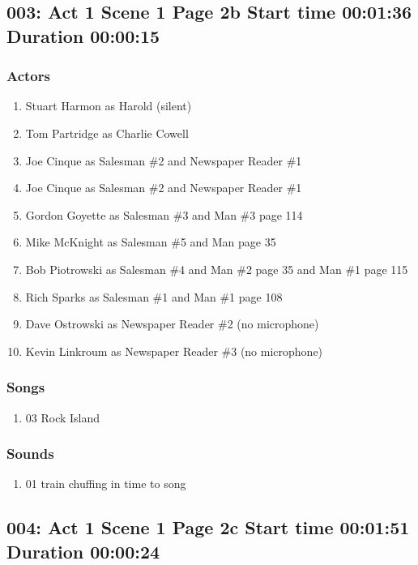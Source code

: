 \subsection{003: Act 1 Scene 1 Page 2b Start time 00:01:36 Duration 00:00:15}

\subsubsection{Actors}
\begin{enumerate}
\item Stuart Harmon as Harold (silent)
\item Tom Partridge as Charlie Cowell
\item Joe Cinque as Salesman \#2 and Newspaper Reader \#1
\item Joe Cinque as Salesman \#2 and Newspaper Reader \#1
\item Gordon Goyette as Salesman \#3 and Man \#3 page 114
\item Mike McKnight as Salesman \#5 and Man page 35
\item Bob Piotrowski as Salesman \#4 and Man \#2 page 35 and Man \#1 page 115
\item Rich Sparks as Salesman \#1 and Man \#1 page 108
\item Dave Ostrowski as Newspaper Reader \#2 (no microphone)
\item Kevin Linkroum as Newspaper Reader \#3 (no microphone)
\end{enumerate}

\subsubsection{Songs}
\begin{enumerate}
\item 03 Rock Island
\end{enumerate}\subsubsection{Sounds}
\begin{enumerate}
\item 01 train chuffing in time to song
\end{enumerate}
\subsection{004: Act 1 Scene 1 Page 2c Start time 00:01:51 Duration 00:00:24}

